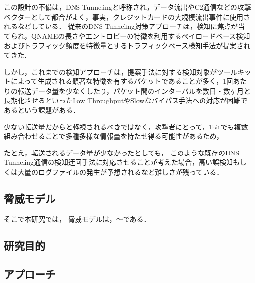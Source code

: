 \documentclass[12pt]{jarticle} %
\begin{document}
この設計の不備は，DNS Tunnelingと呼称され，データ流出やC2通信などの攻撃ベクターとして都合がよく，事実，クレジットカードの大規模流出事件に使用されるなどしている．
従来のDNS Tunneling対策アプローチは，検知に焦点が当てられ，QNAMEの長さやエントロピーの特徴を利用するペイロードベース検知およびトラフィック頻度を特徴量とするトラフィックベース検知手法が提案されてきた．

しかし，これまでの検知アプローチは，提案手法に対する検知対象がツールキットによって生成される顕著な特徴を有するパケットであることが多く，1回あたりの転送データ量を少なくしたり，パケット間のインターバルを数日・数ヶ月と長期化させるといったLow ThroughputやSlowなバイパス手法への対応が困難であるという課題がある．

少ない転送量だからと軽視されるべきではなく，攻撃者にとって，1bitでも複数組み合わせることで多種多様な情報量を持たせ得る可能性があるため，

たとえ，転送されるデータ量が少なかったとしても，
このような既存のDNS Tunneling通信の検知迂回手法に対応させることが考えた場合，高い誤検知もしくは大量のログファイルの発生が予想されるなど難しさが残っている．

\subsection{脅威モデル}
そこで本研究では，
脅威モデルは，〜である．
\subsection{研究目的}
\subsection{アプローチ}
\end{document}
